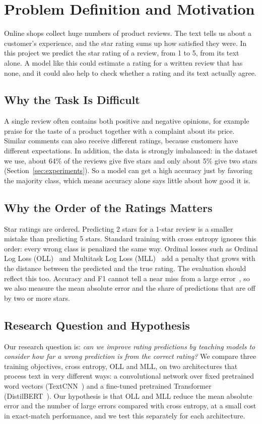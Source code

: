 \section{Problem Definition and Motivation}
\label{sec:intro}

Online shops collect huge numbers of product reviews. The text tells us about a customer's experience, and the star rating sums up how satisfied they were. In this project we predict the star rating of a review, from 1 to 5, from its text alone. A model like this could estimate a rating for a written review that has none, and it could also help to check whether a rating and its text actually agree.

\subsection{Why the Task Is Difficult}
A single review often contains both positive and negative opinions, for example praise for the taste of a product together with a complaint about its price. Similar comments can also receive different ratings, because customers have different expectations. In addition, the data is strongly imbalanced: in the dataset we use, about 64\% of the reviews give five stars and only about 5\% give two stars (Section~\ref{sec:experiments}). So a model can get a high accuracy just by favoring the majority class, which means accuracy alone says little about how good it is.

\subsection{Why the Order of the Ratings Matters}
Star ratings are ordered. Predicting 2 stars for a 1-star review is a smaller mistake than predicting 5 stars. Standard training with cross entropy ignores this order: every wrong class is penalized the same way. Ordinal losses such as Ordinal Log Loss (OLL)~\cite{castagnos2022} and Multitask Log Loss (MLL)~\cite{kasa2024} add a penalty that grows with the distance between the predicted and the true rating. The evaluation should reflect this too. Accuracy and F1 cannot tell a near miss from a large error~\cite{chen2021}, so we also measure the mean absolute error and the share of predictions that are off by two or more stars.

\subsection{Research Question and Hypothesis}
Our research question is: \emph{can we improve rating predictions by teaching models to consider how far a wrong prediction is from the correct rating?} We compare three training objectives, cross entropy, OLL and MLL, on two architectures that process text in very different ways: a convolutional network over fixed pretrained word vectors (TextCNN~\cite{kim2014}) and a fine-tuned pretrained Transformer (DistilBERT~\cite{sanh2019}). Our hypothesis is that OLL and MLL reduce the mean absolute error and the number of large errors compared with cross entropy, at a small cost in exact-match performance, and we test this separately for each architecture.


